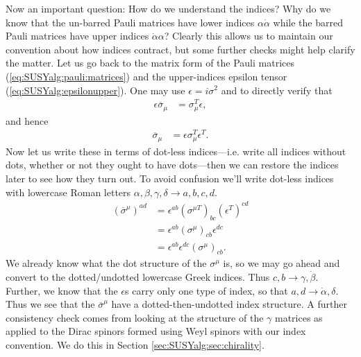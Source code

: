 \documentclass[12pt]{article}
\numberwithin{equation}{section}    %
\begin{document}
Now an important question: How do we understand the indices? Why do we know that the un-barred Pauli matrices have lower indices $\alpha\dot\alpha$ while the barred Pauli matrices have upper indices $\dot\alpha\alpha$? Clearly this allows us to maintain our convention about how indices contract, but some further checks might help clarify the matter. Let us go back to the matrix form of the Pauli matrices (\ref{eq:SUSYalg:pauli:matrices}) and the upper-indices epsilon tensor (\ref{eq:SUSYalg:epsilonupper}). One may use $\epsilon = i\sigma^2$ and to directly verify that 
\begin{align}
	\epsilon\overline\sigma_\mu &= \sigma_\mu^T\epsilon,
\end{align}
and hence
\begin{align}
	\overline\sigma_\mu &= \epsilon\sigma_\mu^T\epsilon^T.
\end{align}
Now let us write these in terms of dot-less indices---i.e. write all indices without dots, whether or not they ought to have dots---then we can restore the indices later to see how they turn out. To avoid confusion we'll write dot-less indices with lowercase Roman letters $\alpha,\beta,\gamma,\delta \rightarrow a,b,c,d$.
\begin{align}
	(\overline \sigma^\mu)^{ad} &= \epsilon^{ab}(\sigma^{\mu T})_{bc}(\epsilon^T)^{cd}\\
	&= \epsilon^{ab}(\sigma^\mu)_{cb} \epsilon^{dc}\\
	&= \epsilon^{ab}\epsilon^{dc}(\sigma^\mu)_{cb}.
\end{align}
We already know what the dot structure of the $\sigma^\mu$ is, so we may go ahead and convert to the dotted/undotted lowercase Greek indices. Thus $c,b \rightarrow \gamma,\dot\beta$. Further, we know that the $\epsilon$s carry only one type of index, so that $a,d \rightarrow \dot\alpha,\delta$. 
Thus we see that the $\overline\sigma^\mu$ have a dotted-then-undotted index structure. A further consistency check comes from looking at the structure of the $\gamma$ matrices as applied to the Dirac spinors formed using Weyl spinors with our index convention. We do this in Section \ref{sec:SUSYalg:sec:chirality}. 
\end{document}
